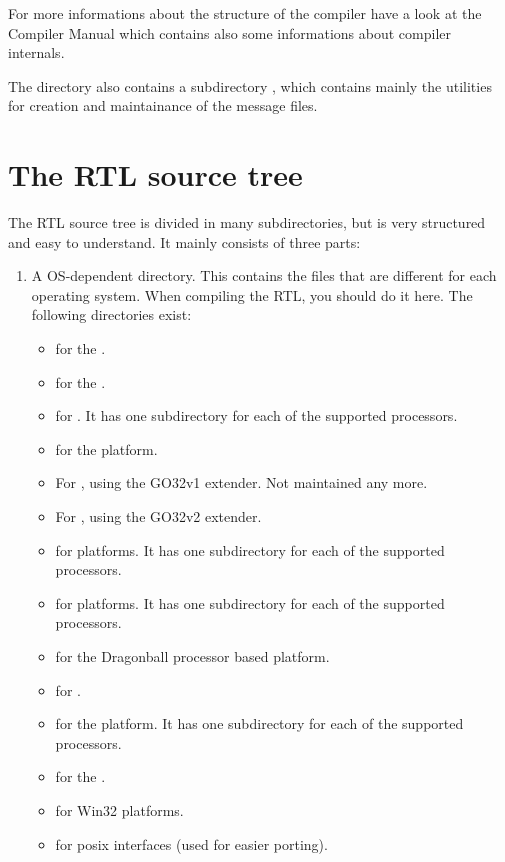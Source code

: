 {For more informations about the structure of the compiler have a look at the
Compiler Manual which contains also some informations about
compiler internals.

The  directory also contains a subdirectory ,
which contains mainly the utilities for creation and maintainance of the
message files.

\section{The RTL source tree}
The RTL source tree is divided in many subdirectories, but is very
structured and easy to understand. It mainly consists of three parts:

\begin{enumerate}
\item A OS-dependent directory. This contains the files that are different for
each operating system. When compiling the RTL, you should do it here. The
following directories exist:
\begin{itemize}
\item {} for the \atari.
\item {} for the \amiga.
\item {}  for \beos. It has one subdirectory for each of the
supported processors.
\item {} for the \freebsd platform.
\item {} For \dos, using the GO32v1 extender. Not maintained any
more.
\item {} For \dos, using the GO32v2 extender.
\item {} for \linux platforms. It has one subdirectory for each of the supported
processors.
\item {} for \netbsd platforms. It has one subdirectory for each of the supported
processors.
\item {} for the \palmos Dragonball processor based platform.
\item {} for \ostwo.
\item {} for the \solaris platform. It has one subdirectory for each of the supported
processors.
\item {} for the \qnx.
\item {} for Win32 platforms.
\item {} for posix interfaces (used for easier porting).

\end{itemize}
\end{enumerate}}

